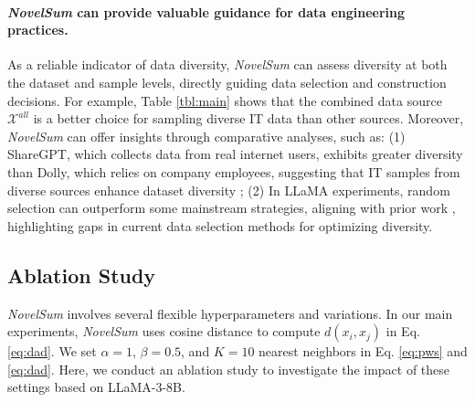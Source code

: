 \paragraph{\textit{NovelSum} can provide valuable guidance for data engineering practices.}
As a reliable indicator of data diversity, \textit{NovelSum} can assess diversity at both the dataset and sample levels, directly guiding data selection and construction decisions. For example, Table \ref{tbl:main} shows that the combined data source $\mathcal{X}^{all}$ is a better choice for sampling diverse IT data than other sources. Moreover, \textit{NovelSum} can offer insights through comparative analyses, such as: (1) ShareGPT, which collects data from real internet users, exhibits greater diversity than Dolly, which relies on company employees, suggesting that IT samples from diverse sources enhance dataset diversity \cite{wang2024diversity-logD}; (2) In LLaMA experiments, random selection can outperform some mainstream strategies, aligning with prior work \cite{xia2024rethinking,diddee2024chasing}, highlighting gaps in current data selection methods for optimizing diversity.



\subsection{Ablation Study}


\textit{NovelSum} involves several flexible hyperparameters and variations. In our main experiments, \textit{NovelSum} uses cosine distance to compute $d(x_i, x_j)$ in Eq. \ref{eq:dad}. We set $\alpha = 1$, $\beta = 0.5$, and $K = 10$ nearest neighbors in Eq. \ref{eq:pws} and \ref{eq:dad}. Here, we conduct an ablation study to investigate the impact of these settings based on LLaMA-3-8B.

